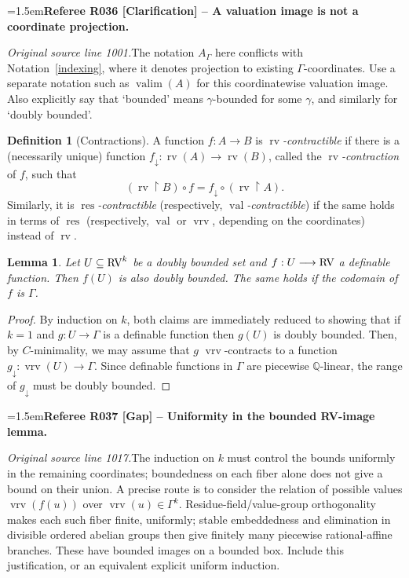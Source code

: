 \documentclass[12pt]{amsart}
\newcommand{\RefereeRemark}[4]{%
  \par\medskip\begingroup\normalfont\small\color{RefereePurple}%
  \emergencystretch=1.5em\noindent\textbf{Referee R#1 [#2] -- #3.}\par\nobreak\noindent #4\par
  \endgroup\medskip
}
\newcommand{\memph}[1]{{\color{magenta}\emph{#1}}}
\theoremstyle{plain}
\newtheorem{lem}[thm]{Lemma}
\theoremstyle{definition}
\newtheorem{defn}[thm]{Definition}
\theoremstyle{remark}
\numberwithin{equation}{section}
\theoremstyle{plain}
\newcommand{\RV}{\textup{RV}}
\DeclareMathOperator{\res}{res}  %
\newcommand{\Q}{\mathds{Q}}
\newcommand{\cmin}{$C$\nobreakdash}
\newcommand{\0}{\emptyset}
\newcommand{\rest}{\upharpoonright}
\newcommand{\fun}{\longrightarrow}
\newcommand{\sub}{\subseteq}
\DeclareMathOperator{\rv}{rv}
\DeclareMathOperator{\vv}{val}
\DeclareMathOperator{\vrv}{vrv}
\begin{document}
\RefereeRemark{036}{Clarification}{A valuation image is not a coordinate projection}{%
\textit{Original source line 1001.}\quad The notation $A_\Gamma$ here conflicts with Notation~\ref{indexing}, where it denotes projection to existing $\Gamma$-coordinates. Use a separate notation such as $\operatorname{valim}(A)$ for this coordinatewise valuation image. Also explicitly say that `bounded' means $\gamma$-bounded for some $\gamma$, and similarly for `doubly bounded'.
}

\begin{defn}[Contractions]\label{defn:corr:cont}
A function $f : A \fun B$ is \memph{$\rv$-contractible} if there is a (necessarily unique) function $f_{\downarrow} : \rv(A) \fun \rv(B)$, called the \memph{$\rv$-contraction} of $f$, such that
\[
(\rv \rest B) \circ f = f_{\downarrow} \circ (\rv \rest A).
\]
Similarly, it is \memph{$\res$-contractible} (respectively, \memph{$\vv$-contractible}) if the same holds in terms of $\res$ (respectively, $\vv$ or $\vrv$, depending on the coordinates) instead of $\rv$.
\end{defn}


\begin{lem}\label{db:to:db}
Let $U \sub \RV^k$ be a doubly bounded set and $f: U \fun \RV$ a definable function. Then $f(U)$ is also doubly bounded. The same holds if the codomain of $f$ is $\Gamma$.
\end{lem}
\begin{proof}
By induction on $k$, both claims are immediately reduced to showing that if $k=1$  and $g : U \fun \Gamma$ is a definable function then $g(U)$ is doubly bounded. Then, by \cmin-minimality, we may assume that $g$  $\vrv$-contracts to a function $g_{\downarrow} : \vrv(U) \fun \Gamma$. Since definable functions in $\Gamma$ are piecewise $\Q$-linear, the range of $g_{\downarrow}$ must be doubly bounded.
\end{proof}

\RefereeRemark{037}{Gap}{Uniformity in the bounded RV-image lemma}{%
\textit{Original source line 1017.}\quad The induction on $k$ must control the bounds uniformly in the remaining coordinates; boundedness on each fiber alone does not give a bound on their union. A precise route is to consider the relation of possible values $\vrv(f(u))$ over $\vrv(u)\in\Gamma^k$. Residue-field/value-group orthogonality makes each such fiber finite, uniformly; stable embeddedness and elimination in divisible ordered abelian groups then give finitely many piecewise rational-affine branches. These have bounded images on a bounded box. Include this justification, or an equivalent explicit uniform induction.
}
\end{document}
